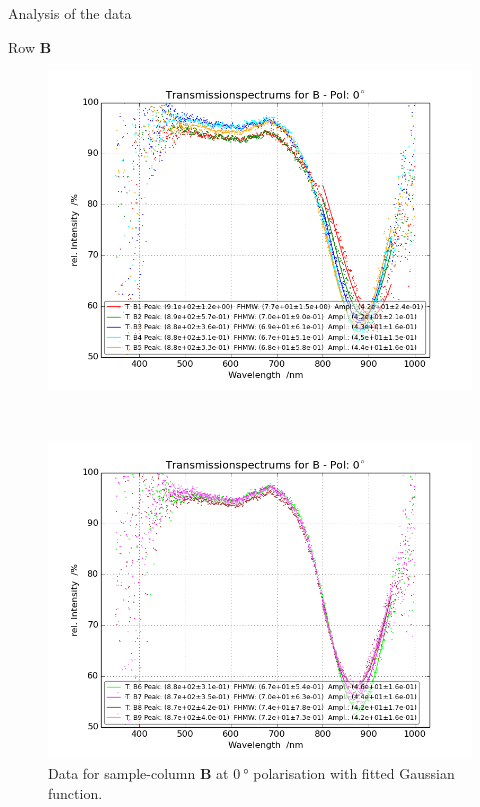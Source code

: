\documentclass[pdftex, a4paper,11pt, twoside, UKenglish]{report}
\begin{document}
\begin{chapter}{Analysis of the data}
\begin{section}{Row \textbf{B}}
      \newpage
      \begin{figure}[ht!]
        \centering
        \begin{minipage}{.95\textwidth}
          \centering
          \includegraphics[width=\textwidth]
              {Figures/TransspecFIT_BPol0_1to5.png}
          \caption{Data for sample-column \textbf{B} at $\SI{0}{\degree}$
              polarisation with fitted Gaussian function.}
          \label{fig:TransspecFIT_BPol0_1to5}
        \end{minipage}\\
        \begin{minipage}{.95\textwidth}
          \centering
          \includegraphics[width=\textwidth]
              {Figures/TransspecFIT_BPol0_6to9.png}

\end{minipage}
\end{figure}
\end{section}
\end{chapter}
\end{document}
